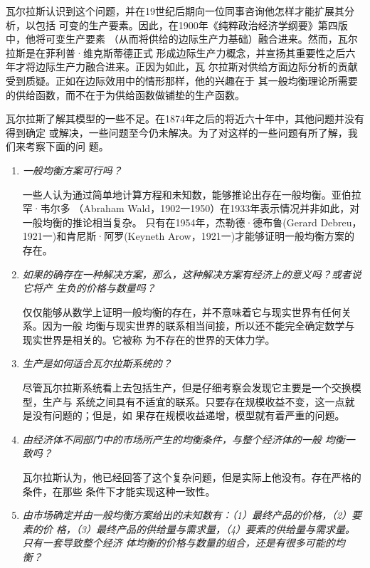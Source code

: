 瓦尔拉斯认识到这个问题，并在19世纪后期向一位同事咨询他怎样才能扩展其分析，以包括
可变的生产要素。因此，在1900年《纯粹政治经济学纲要》第四版中，他将可变生产要素
（从而将供给的边际生产力基础）融合进来。然而，瓦尔拉斯是在菲利普·维克斯蒂德正式
形成边际生产力概念，并宣扬其重要性之后六年才将边际生产力融合进来。正因为如此，瓦
尔拉斯对供给方面边际分析的贡献受到质疑。正如在边际效用中的情形那样，他的兴趣在于
其一般均衡理论所需要的供给函数，而不在于为供给函数做铺垫的生产函数。

瓦尔拉斯了解其模型的一些不足。在1874年之后的将近六十年中，其他问题并没有得到确定
或解决，一些问题至今仍未解决。为了对这样的一些问题有所了解，我们来考察下面的问
题。
\begin{enumerate}
\item \textit{一般均衡方案可行吗？}

  一些人认为通过简单地计算方程和未知数，能够推论出存在一般均衡。亚伯拉罕·韦尔多
  （Abraham Wald，1902一1950）在1933年表示情况并非如此，对一般均衡的推论相当复杂。
  只有在1954年，杰勒德·德布鲁(Gerard Debreu，1921一)和肯尼斯·阿罗(Keyneth
  Arow，1921一)才能够证明一般均衡方案的存在。

\item \textit{如果的确存在一种解决方案，那么，这种解决方案有经济上的意义吗？或者说它将产
  生负的价格与数量吗？}

  仅仅能够从数学上证明一般均衡的存在，并不意味着它与现实世界有任何关系。因为一般
  均衡与现实世界的联系相当间接，所以还不能完全确定数学与现实世界是相关的。它被称
  为不存在的世界的天体力学。

\item \textit{生产是如何适合瓦尔拉斯系统的？}

  尽管瓦尔拉斯系统看上去包括生产，但是仔细考察会发现它主要是一个交换模型，生产与
  系统之间具有不适宜的联系。只要存在规模收益不变，这一点就是没有问题的；但是，如
  果存在规模收益递增，模型就有着严重的问题。

\item \textit{由经济体不同部门中的市场所产生的均衡条件，与整个经济体的一般
均衡一致吗？}

瓦尔拉斯认为，他已经回答了这个复杂问题，但是实际上他没有。存在严格的条件，在那些
条件下才能实现这种一致性。

\item \textit{由市场确定并由一般均衡方案给出的未知数有：（1）最终产品的价格，（2）要素的价
  格，（3）最终产品的供给量与需求量，（4）要素的供给量与需求量。只有一套导致整个经济
  体均衡的价格与数量的组合，还是有很多可能的均衡？}


\end{enumerate}
